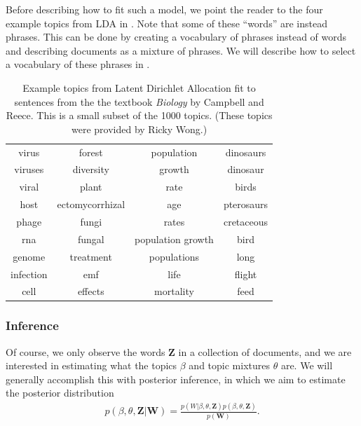Before describing how to fit such a model, we point the reader to the
four example topics from LDA in .  Note that
some of these ``words'' are instead phrases.  This can be done by
creating a vocabulary of phrases instead of words and describing
documents as a mixture of phrases.  We will describe how to select a
vocabulary of these phrases in
.
\begin{table}
  \caption{Example topics from Latent Dirichlet Allocation fit to sentences from the the textbook \emph{Biology} by Campbell and Reece.  This is a small subset of the 1000 topics. (These topics were provided by Ricky Wong.)}
  \center  \begin{tabular}{|c|c|c|c|}
    \hline
    virus & forest & population & dinosaurs \\
    viruses & diversity & growth & dinosaur \\
    viral & plant & rate & birds \\
    host & ectomycorrhizal & age & pterosaurs \\
    phage & fungi & rates & cretaceous \\
    rna & fungal & population growth & bird \\
    genome & treatment & populations & long \\
    infection & emf & life & flight \\
    cell & effects & mortality & feed \\
    \hline
  \end{tabular}
  \label{fig:example_lda_topics}
\end{table}

\subsubsection{Inference}
Of course, we only observe the words $\bm Z$ in a collection of
documents, and we are interested in estimating what the topics $\beta$
and topic mixtures $\theta$ are.  We will generally accomplish this
with posterior inference, in which we aim to estimate the posterior
distribution
\begin{align}
  p(\beta, \theta, \bm Z | \bm W) = \frac{p(W | \beta, \theta, \bm Z) p(\beta, \theta, \bm Z)}{p(\bm W)}.
\end{align}

